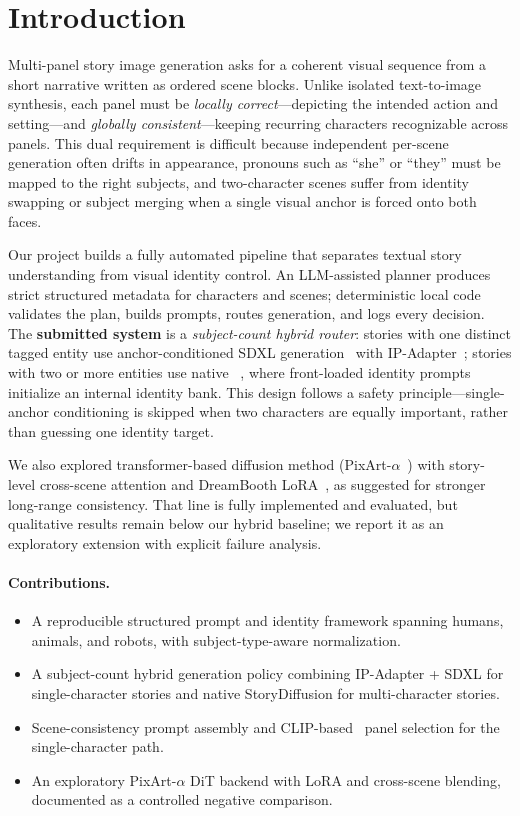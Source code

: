 \section{Introduction}
\label{sec:intro}

Multi-panel story image generation asks for a coherent visual sequence from a short narrative written as ordered scene blocks.
Unlike isolated text-to-image synthesis, each panel must be \emph{locally correct}---depicting the intended action and setting---and \emph{globally consistent}---keeping recurring characters recognizable across panels.
This dual requirement is difficult because independent per-scene generation often drifts in appearance, pronouns such as ``she'' or ``they'' must be mapped to the right subjects, and two-character scenes suffer from identity swapping or subject merging when a single visual anchor is forced onto both faces.

Our project builds a fully automated pipeline that separates textual story understanding from visual identity control.
An LLM-assisted planner produces strict structured metadata for characters and scenes; deterministic local code validates the plan, builds prompts, routes generation, and logs every decision.
The \textbf{submitted system} is a \emph{subject-count hybrid router}: stories with one distinct tagged entity use anchor-conditioned SDXL generation~\cite{podell2023sdxl} with IP-Adapter~\cite{ye2023ip-adapter}; stories with two or more entities use native ~\cite{zhou2024storydiffusion}, where front-loaded identity prompts initialize an internal identity bank.
This design follows a safety principle---single-anchor conditioning is skipped when two characters are equally important, rather than guessing one identity target.

 We also explored transformer-based diffusion method (PixArt-$\alpha$~\cite{chen2023pixartalpha}) with story-level cross-scene attention and DreamBooth LoRA~\cite{ruiz2022dreambooth}, as suggested for stronger long-range consistency.
That line is fully implemented and evaluated, but qualitative results remain below our hybrid baseline; we report it as an exploratory extension with explicit failure analysis.

\paragraph{Contributions.}
\begin{itemize}
  \item A reproducible structured prompt and identity framework spanning humans, animals, and robots, with subject-type-aware normalization.
  \item A subject-count hybrid generation policy combining IP-Adapter + SDXL for single-character stories and native StoryDiffusion for multi-character stories.
  \item Scene-consistency prompt assembly and CLIP-based~\cite{radford2021learning} panel selection for the single-character path.
  \item An exploratory PixArt-$\alpha$ DiT backend with LoRA and cross-scene blending, documented as a controlled negative comparison.
\end{itemize}

